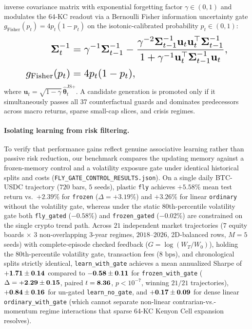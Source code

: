 \begin{enumerate}
inverse covariance matrix \cite{sherman1950adjustment} with exponential forgetting factor $\gamma \in (0,1)$
and modulates the 64-KC readout via a Bernoulli Fisher information uncertainty gate
$g_{\text{Fisher}}(p_t) = 4 p_t(1-p_t)$ on the isotonic-calibrated probability $p_t \in (0,1)$:
\begin{equation}
\resizebox{0.86\columnwidth}{!}{$\displaystyle
\begin{aligned}
\boldsymbol{\Sigma}_t^{-1} &= \gamma^{-1}\boldsymbol{\Sigma}_{t-1}^{-1} - \frac{\gamma^{-2}\boldsymbol{\Sigma}_{t-1}^{-1}\mathbf{u}_t\mathbf{u}_t^\top\boldsymbol{\Sigma}_{t-1}^{-1}}{1 + \gamma^{-1}\mathbf{u}_t^\top\boldsymbol{\Sigma}_{t-1}^{-1}\mathbf{u}_t}, \\
g_{\text{Fisher}}(p_t) &= 4 p_t(1-p_t),
\end{aligned}
$}
\end{equation}
where $\mathbf{u}_t = \sqrt{1-\gamma}\,\hat{\boldsymbol{\theta}}_t^{\text{JS}+}$. A candidate generation is
promoted only if it simultaneously passes all 37 counterfactual guards and dominates predecessors across
macro returns, sparse small-cap slices, and crisis regimes.
\end{enumerate}

\paragraph{Isolating learning from risk filtering.}
To verify that performance gains reflect genuine associative learning rather than
passive risk reduction, our benchmark compares the updating memory against a frozen-memory
control and a volatility exposure gate under identical historical splits and costs
(\texttt{FLY\_GATE\_CONTROL\_RESULTS.json}). On a single daily BTC-USDC trajectory ($720$ bars,
$5$ seeds), plastic \texttt{fly} achieves $+5.58\%$ mean test return vs.\ $+2.39\%$ for
\texttt{frozen} ($\Delta = +3.19\%$) and $+3.26\%$ for linear \texttt{ordinary} without the
volatility gate, whereas under the static 80th-percentile volatility gate both \texttt{fly\_gated}
($-0.58\%$) and \texttt{frozen\_gated} ($-0.02\%$) are constrained on the single crypto trend path.
Across $21$ independent market trajectories ($7$ equity boards $\times$ $3$ non-overlapping 3-year
regimes, $2018\text{--}2026$, \PanelBalancedRows{} 2D-balanced rows, $M=5$ seeds) with complete-episode checked
feedback ($G = \log(W_T/W_0)$), holding the 80th-percentile volatility gate, transaction fees
($8\text{ bps}$), and chronological splits strictly identical, \texttt{learn\_with\_gate} achieves
a mean annualized Sharpe of $\mathbf{+1.71{} \pm 0.14}$ compared to $\mathbf{-0.58{} \pm 0.11}$
for \texttt{frozen\_with\_gate} ($\Delta = \mathbf{+2.29{} \pm 0.15}$, paired $t = \mathbf{8.36{}}$,
$p < 10^{-7}$, winning $21/21$ trajectories), $\mathbf{+0.84{} \pm 0.16}$ for un-gated \texttt{learn\_no\_gate},
and $\mathbf{+0.17{} \pm 0.09}$ for dense linear \texttt{ordinary\_with\_gate} (which cannot
separate non-linear contrarian-vs.-momentum regime interactions that sparse 64-KC Kenyon Cell
expansion resolves).

